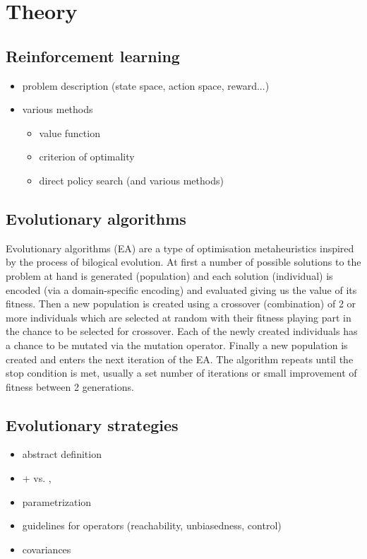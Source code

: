 \chapter{Theory}
\label{chap:theory}

\section{Reinforcement learning}
\label{sec:reinf}
\begin{itemize}
    \item problem description (state space, action space, reward...)
    \item various methods \begin{itemize}
        \item value function
        \item criterion of optimality
        \item direct policy search (and various methods)
    \end{itemize}
\end{itemize}
\section{Evolutionary algorithms}
\label{sec:ea}
Evolutionary algorithms (EA) are a type of optimisation metaheuristics inspired by the process of bilogical evolution. At first a number of possible solutions to the problem at hand is generated (population) and each solution (individual) is encoded (via a domain-specific encoding) and evaluated giving us the value of its fitness. Then a new population is created using a crossover (combination) of 2 or more individuals which are selected at random with their fitness playing part in the chance to be selected for crossover. Each of the newly created individuals has a chance to be mutated via the mutation operator. Finally a new population is created and enters the next iteration of the EA. The algorithm repeats until the stop condition is met, usually a set number of iterations or small improvement of fitness between 2 generations. \cite{Vikhar2016}
\section{Evolutionary strategies}
\label{sec:es}
\begin{itemize}
    \item abstract definition
    \item + vs. ,
    \item parametrization
    \item guidelines for operators (reachability, unbiasedness, control)
    \item covariances
\end{itemize}
     \cite{Rudolph2012}
